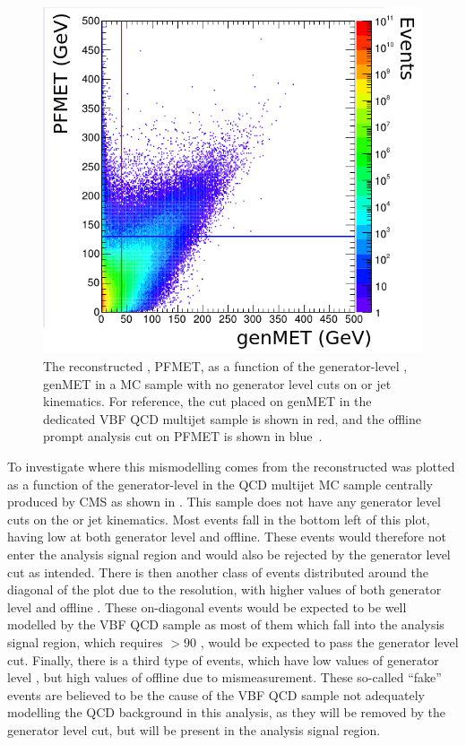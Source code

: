 \begin{figure}
  \includegraphics[width=.7\largefigwidth]{plots/parked/AN-14-243-figs/Joao_140209_p11.png}
  \caption{The reconstructed \MET, PFMET, as a function of the generator-level \MET, genMET in a MC sample with no generator level cuts on \MET or jet kinematics. For reference, the cut placed on genMET in the dedicated VBF QCD multijet sample is shown in red, and the offline prompt analysis cut on PFMET is shown in blue~\cite{ARTICLE:CMSAN-14-243}.}
  \label{fig:parkedmcqcd}
\end{figure}

To investigate where this mismodelling comes from the reconstructed \MET was plotted as a function of the generator-level \MET in the \ac{QCD} multijet \ac{MC} sample centrally produced by CMS as shown in . This sample does not have any generator level cuts on the \MET or jet kinematics. Most events fall in the bottom left of this plot, having low \MET at both generator level and offline. These events would therefore not enter the analysis signal region and would also be rejected by the generator level cut as intended. There is then another class of events distributed around the diagonal of the plot due to the \MET resolution, with higher values of both generator level and offline \MET. These on-diagonal events would be expected to be well modelled by the \ac{VBF} \ac{QCD} sample as most of them which fall into the analysis signal region, which requires \MET$>90$ \GeV, would be expected to pass the generator level cut. Finally, there is a third type of events, which have low values of generator level \MET, but high values of offline \MET due to mismeasurement. These so-called ``fake'' \MET events are believed to be the cause of the \ac{VBF} \ac{QCD} sample not adequately modelling the \ac{QCD} background in this analysis, as they will be removed by the generator level cut, but will be present in the analysis signal region. 

